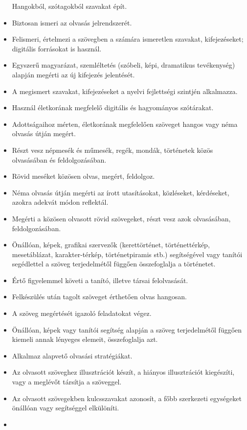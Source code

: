 \begin{itemize}
  Hangokból, szótagokból szavakat épít.
\item
  Biztosan ismeri az olvasás jelrendszerét.
\item
  Felismeri, értelmezi a szövegben a számára ismeretlen szavakat,
  kifejezéseket; digitális forrásokat is használ.
\item
  Egyszerű magyarázat, szemléltetés (szóbeli, képi, dramatikus
  tevékenység) alapján megérti az új kifejezés jelentését.
\item
  A megismert szavakat, kifejezéseket a nyelvi fejlettségi szintjén
  alkalmazza.
\item
  Használ életkorának megfelelő digitális és hagyományos szótárakat.
\item
  Adottságaihoz mérten, életkorának megfelelően szöveget hangos vagy
  néma olvasás útján megért.
\item
  Részt vesz népmesék és műmesék, regék, mondák, történetek közös
  olvasásában és feldolgozásában.
\item
  Rövid meséket közösen olvas, megért, feldolgoz.
\item
  Néma olvasás útján megérti az írott utasításokat, közléseket,
  kérdéseket, azokra adekvát módon reflektál.
\item
  Megérti a közösen olvasott rövid szövegeket, részt vesz azok
  olvasásában, feldolgozásában.
\item
  Önállóan, képek, grafikai szervezők (kerettörténet, történettérkép,
  mesetáblázat, karakter-térkép, történetpiramis stb.) segítségével vagy
  tanítói segédlettel a szöveg terjedelmétől függően összefoglalja a
  történetet.
\item
  Értő figyelemmel követi a tanító, illetve társai felolvasását.
\item
  Felkészülés után tagolt szöveget érthetően olvas hangosan.
\item
  A szöveg megértését igazoló feladatokat végez.
\item
  Önállóan, képek vagy tanítói segítség alapján a szöveg terjedelmétől
  függően kiemeli annak lényeges elemeit, összefoglalja azt.
\item
  Alkalmaz alapvető olvasási stratégiákat.
\item
  Az olvasott szöveghez illusztrációt készít, a hiányos illusztrációt
  kiegészíti, vagy a meglévőt társítja a szöveggel.
\item
  Az olvasott szövegekben kulcsszavakat azonosít, a főbb szerkezeti
  egységeket önállóan vagy segítséggel elkülöníti.
\item

\end{itemize}
